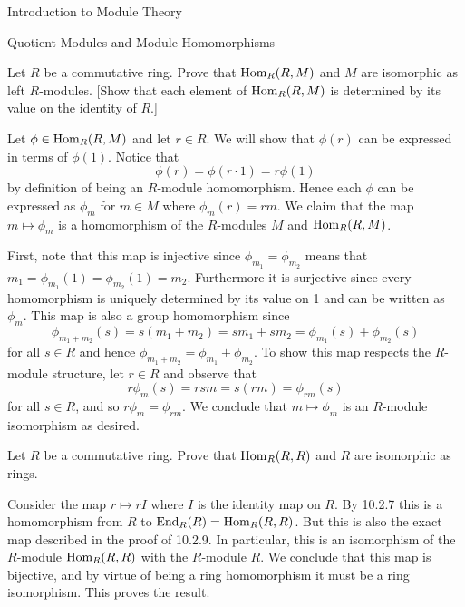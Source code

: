 \begin{chapter}{Introduction to Module Theory}
\begin{section}{Quotient Modules and Module Homomorphisms}
\begin{problem}\label{ex:10.2.9}
Let $R$ be a commutative ring. Prove that $\operatorname{Hom}_R(R,M)$ and $M$ are isomorphic as left $R$-modules. [Show that each element of $\operatorname{Hom}_R(R,M)$ is determined by its value on the identity of $R$.]
\end{problem}
\begin{solution}
Let $\phi\in \operatorname{Hom}_R(R,M)$ and let $r\in R$. We will show that $\phi(r)$ can be expressed in terms of $\phi(1)$. Notice that \[
\phi(r) = \phi(r\cdot 1) = r\phi(1)
\]
by definition of being an $R$-module homomorphism. Hence each $\phi$ can be expressed as $\phi_m$ for $m\in M$ where $\phi_m(r) = rm$. We claim that the map $m\mapsto \phi_m$ is a homomorphism of the $R$-modules $M$ and $\operatorname{Hom}_R(R,M)$. 

First, note that this map is injective since $\phi_{m_1} = \phi_{m_2}$ means that $m_1 = \phi_{m_1}(1) = \phi_{m_2}(1) = m_2$. Furthermore it is surjective since every homomorphism is uniquely determined by its value on 1 and can be written as $\phi_m$. This map is also a group homomorphism since \[
\phi_{m_1+m_2}(s)  = s(m_1+m_2) = sm_1+sm_2 = \phi_{m_1}(s) + \phi_{m_2}(s)
\] for all $s\in R$ and hence $\phi_{m_1+m_2} = \phi_{m_1} + \phi_{m_2}$. To show this map respects the $R$-module structure, let $r\in R$ and observe that \[
r\phi_m(s) =rsm = s(rm) = \phi_{rm}(s)\]
for all $s\in R$, and so $r\phi_m = \phi_{rm}$. We conclude  that $m\mapsto \phi_m$ is an $R$-module isomorphism as desired.
\end{solution}\oneperpage



\begin{problem}\label{ex:10.2.10}
Let $R$ be a commutative ring. Prove that $\operatorname{Hom}_R(R,R)$ and $R$ are isomorphic as rings.
\end{problem}
\begin{solution}
Consider the map $r\mapsto rI$ where $I$ is the identity map on $R$. By 10.2.7 this is a homomorphism from $R$ to $\operatorname{End}_R(R) = \operatorname{Hom}_R(R,R)$. But this is also the exact map described in the proof of 10.2.9. In particular, this is an isomorphism of the $R$-module $\operatorname{Hom}_R(R,R)$ with the $R$-module $R$. We conclude that this map is bijective, and by virtue of being a ring homomorphism it must be a ring isomorphism. This proves the result. 
\end{solution}\oneperpage




\end{section}
\end{chapter}

